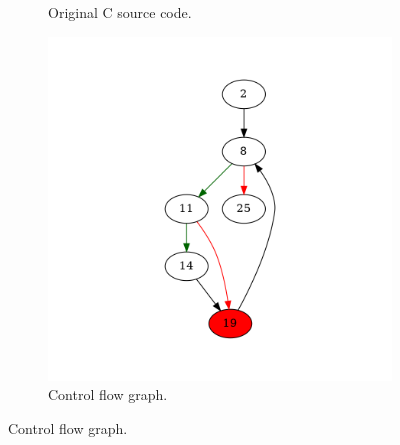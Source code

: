 \begin{figure}[htbp]
	\centering
	\begin{subfigure}[b]{0.48\textwidth}
		\centering
		
		\caption{Original C source code.}
	\end{subfigure}
	\begin{subfigure}[b]{0.50\textwidth}
		\centering
		\includegraphics[width=\textwidth]{inc/appendices/examples/hammock/example/without-break/main_0001b.png}
		\caption{Control flow graph.}
	\end{subfigure}
\end{figure}


